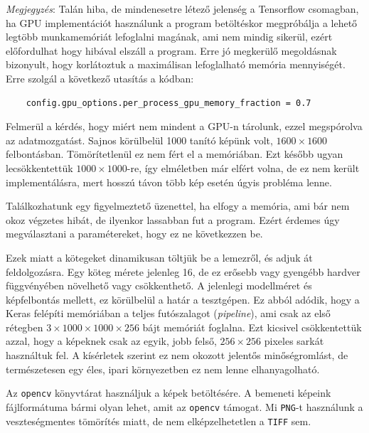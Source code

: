 \label{gpu.memory}
\textit{Megjegyzés}: Talán hiba, de mindenesetre létező jelenség a Tensorflow csomagban, ha GPU implementációt használunk a program betöltéskor megpróbálja a lehető legtöbb 
munkamemóriát lefoglalni magának, ami nem mindig sikerül, 
ezért előfordulhat hogy hibával elszáll a program. Erre jó megkerülő megoldásnak bizonyult, hogy
korlátoztuk a maximálisan lefoglalható memória mennyiségét. Erre szolgál a következő utasítás a kódban:
\begin{lstlisting}
	config.gpu_options.per_process_gpu_memory_fraction = 0.7
\end{lstlisting}


Felmerül a kérdés, hogy miért nem mindent a GPU-n tárolunk, ezzel megspórolva az adatmozgatást.
Sajnos körülbelül 1000 tanító képünk volt, $ 1600 \times 1600 $ felbontásban. 
Tömörítetlenül ez nem fért el a memóriában. Ezt később ugyan lecsökkentettük
$ 1000 \times 1000 $-re, így elméletben már elfért volna, de ez nem került implementálásra,
mert hosszú távon több kép esetén úgyis probléma lenne.



Találkozhatunk egy figyelmeztető üzenettel, ha elfogy a memória, ami bár nem 
okoz végzetes hibát, de ilyenkor lassabban fut a program. Ezért érdemes úgy megválasztani
a paramétereket, hogy ez ne következzen be.


Ezek miatt a kötegeket dinamikusan töltjük be a lemezről, és adjuk át feldolgozásra.
Egy köteg mérete jelenleg 16, de ez erősebb vagy gyengébb hardver függvényében 
növelhető vagy csökkenthető. A jelenlegi modellméret és képfelbontás mellett, ez 
körülbelül a határ a tesztgépen. Ez abból adódik, hogy a Keras felépíti memóriában 
a teljes futószalagot (\textit{pipeline}), ami csak az első rétegben
$ 3 \times 1000 \times 1000 \times 256 $ bájt memóriát foglalna.
Ezt kicsivel csökkentettük azzal, hogy a képeknek csak az egyik, jobb felső,
$ 256 \times 256 $ pixeles sarkát használtuk fel. A kísérletek szerint ez nem okozott
jelentős minőségromlást, de természetesen egy éles, ipari környezetben ez nem lenne
elhanyagolható.




Az \texttt{opencv} könyvtárat használjuk a képek betöltésére.
A bemeneti képeink fájlformátuma bármi olyan lehet, amit az \texttt{opencv} támogat.
Mi \texttt{PNG}-t használunk a veszteségmentes tömörítés miatt, de nem elképzelhetetlen
a \texttt{TIFF} sem.



